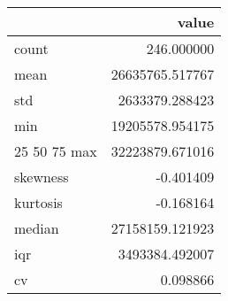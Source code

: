 \begin{tabular}{lr}
\toprule
 & value \\
\midrule
count & 246.000000 \\
mean & 26635765.517767 \\
std & 2633379.288423 \\
min & 19205578.954175 \\
25%
50%
75%
max & 32223879.671016 \\
skewness & -0.401409 \\
kurtosis & -0.168164 \\
median & 27158159.121923 \\
iqr & 3493384.492007 \\
cv & 0.098866 \\
\bottomrule
\end{tabular}
